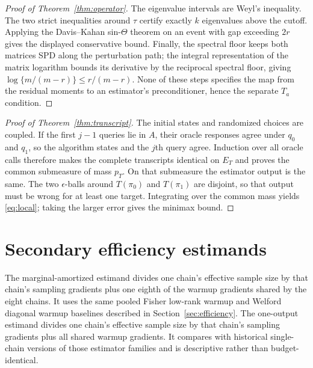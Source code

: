 \documentclass[11pt]{article}
\theoremstyle{plain}
\theoremstyle{definition}
\theoremstyle{remark}
\begin{document}
\begin{proof}[Proof of Theorem~\ref{thm:operator}]
The eigenvalue intervals are Weyl's inequality. The two strict inequalities
around $\tau$ certify exactly $k$ eigenvalues above the cutoff. Applying the
Davis--Kahan sin-$\Theta$ theorem on an event with gap exceeding $2r$ gives the
displayed conservative bound. Finally, the spectral floor keeps both matrices
SPD along the perturbation path; the integral representation of the matrix
logarithm bounds its derivative by the reciprocal spectral floor, giving
$\log\{m/(m-r)\}\le r/(m-r)$. None of these steps specifies the map from the
residual moments to an estimator's preconditioner, hence the separate $T_a$
condition.
\end{proof}

\begin{proof}[Proof of Theorem~\ref{thm:transcript}]
The initial states and randomized choices are coupled. If the first $j-1$
queries lie in $A$, their oracle responses agree under $q_0$ and $q_1$, so the
algorithm states and the $j$th query agree. Induction over all oracle calls
therefore makes the complete transcripts identical on $E_T$ and proves
the common submeasure of mass $p_T$. On that submeasure the estimator
output is the same. The two $\epsilon$-balls around $T(\pi_0)$ and $T(\pi_1)$
are disjoint, so that output must be wrong for at least one target. Integrating
over the common mass yields \eqref{eq:local}; taking the larger error gives the
minimax bound.
\end{proof}

\section{Secondary efficiency estimands}\label{app:secondary-efficiency}

The marginal-amortized estimand divides one chain's effective sample size by
that chain's sampling gradients plus one eighth of the warmup gradients shared
by the eight chains. It uses the same pooled Fisher low-rank warmup and Welford
diagonal warmup baselines described in Section~\ref{sec:efficiency}. The
one-output estimand divides one chain's effective sample size by that chain's
sampling gradients plus all shared warmup gradients. It compares with
historical single-chain versions of those estimator families and is descriptive
rather than budget-identical.
\end{document}
